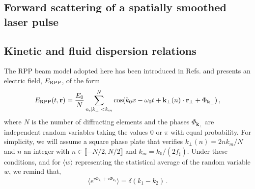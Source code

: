 \documentclass[
 reprint,
 superscriptaddress,
 amsmath,amssymb,
 aps,
]{revtex4-1}
\begin{document}
 \begin{widetext}
\section{Forward scattering of a spatially smoothed laser pulse}
\subsection{Kinetic and fluid dispersion relations}\label{sec:diperpp}
The RPP beam model adopted here has been introduced in  Refs. \cite[]{POF_Schmitt_88,POF_Rose_93} and presents an electric field, $E_{\rm RPP}$, of the form
 \begin{align}
E_{\rm RPP}(t,\mathbf{r})  = \frac{E_0}{N} \sum_{n,\vert k_{\perp}\vert<k_m }^N  \cos(k_0x - \omega_0t +\mathbf{k}_\perp(n) \cdot \mathbf{r}_\perp +\Phi_{\mathbf{k}_\perp})\, , \label{eq:erpp}
 \end{align}
 where  $N$ is the number of diffracting elements and the phases $\Phi_{\mathbf{k}_\perp}$ are  independent random variables taking the values $0$ or $\pi$ with equal probability.
 For simplicity, we will assume a square phase plate that verifies $k_{\perp}(n) = 2nk_m/N$ and  $n$ an integer with $n\in \llbracket - N/2 ,N/2 \rrbracket$ and $k_m = k_0/(2f_\sharp)$. 
 Under these conditions, and for $\langle w\rangle$ representing the statistical average of the random variable $w$,  we remind that,
 \begin{equation}\label{eq:d}
 \langle e^{i\Phi_{k_1}+i\Phi_{k_2}}\rangle=\delta(k_1-k_2) \, . 
 \end{equation}


\end{widetext}
\end{document}

